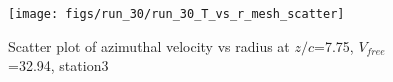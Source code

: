 \begin{figure}[H]
\centering
\texttt{[image: figs/run\_30/run\_30\_T\_vs\_r\_mesh\_scatter]}
\caption{Scatter plot of azimuthal velocity vs radius at $z/c$=7.75, $V_{free}$=32.94, station3}
\label{fig:run_30_T_vs_r_mesh_scatter}
\end{figure}


